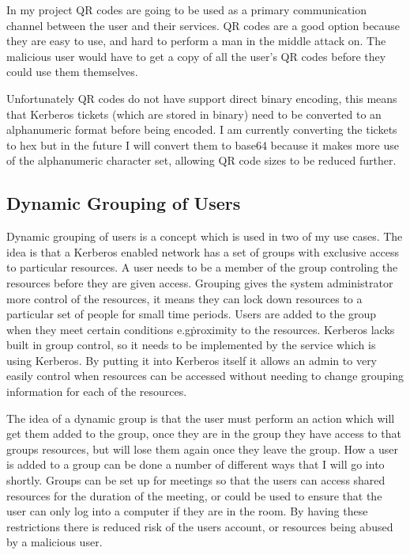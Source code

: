\documentclass[]{report}   %
\begin{document}
In my project QR codes are going to be used as a primary communication channel between the user and their services. QR codes are a good option because they are easy to use, and hard to perform a man in the middle attack on. The malicious user would have to get a copy of all the user's QR codes before they could use them themselves.

Unfortunately QR codes do not have support direct binary encoding, this means that Kerberos tickets (which are stored in binary) need to be converted to an alphanumeric format before being encoded. I am currently converting the tickets to hex but in the future I will convert them to base64 because it makes more use of the alphanumeric character set, allowing QR code sizes to be reduced further.

\subsection{Dynamic Grouping of Users}
Dynamic grouping of users is a concept which is used in two of my use cases. The idea is that a Kerberos enabled network has a set of groups with exclusive access to particular resources. A user needs to be a member of the group controling the resources before they are given access. Grouping gives the system administrator more control of the resources, it means they can lock down resources to a particular set of people for small time periods. Users are added to the group when they meet certain conditions e.g\. proximity to the resources. Kerberos lacks built in group control, so it needs to be implemented by the service which is using Kerberos. By putting it into Kerberos itself it allows an admin to very easily control when resources can be accessed without needing to change grouping information for each of the resources.

The idea of a dynamic group is that the user must perform an action which will get them added to the group, once they are in the group they have access to that groups resources, but will lose them again once they leave the group. How a user is added to a group can be done a number of different ways that I will go into shortly. Groups can be set up for meetings so that the users can access shared resources for the duration of the meeting, or could be used to ensure that the user can only log into a computer if they are in the room. By having these restrictions there is reduced risk of the users account, or resources being abused by a malicious user.
\end{document}
